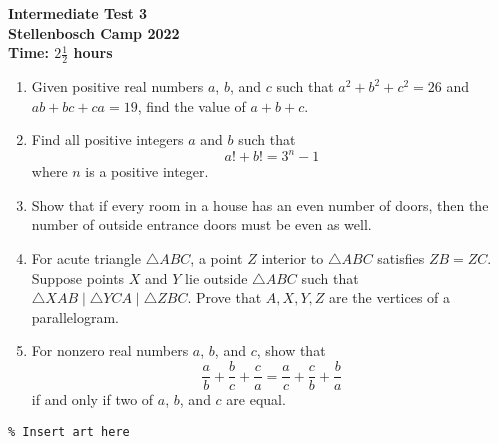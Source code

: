 \documentclass{article}
\begin{document}
\thispagestyle{empty}

\begin{center}
  \textbf{\Large Intermediate Test 3}
  \\ \vspace{1em}
  \textbf{\large Stellenbosch Camp 2022}
  \\ \vspace{1em}
  \textbf{\large Time: $2\frac{1}{2}$ hours}
\end{center}

\bigskip

\begin{enumerate}[itemsep=\fill]

\item %
Given positive real numbers $a$, $b$, and $c$ such that $a^2+b^2+c^2 = 26$ and $ab+bc+ca = 19$, find the value of $a+b+c$.


\item %
Find all positive integers $a$ and $b$ such that 
$$a! + b! = 3^n -1 $$
where $n$ is a positive integer.


\item %
Show that if every room in a house has an even number of doors, then the number of outside entrance doors must be even as well.


\item %
For acute triangle $\triangle ABC$, a point $Z$ interior to $\triangle ABC$ satisfies $ZB = ZC$.
Suppose points $X$ and $Y$ lie outside $\triangle ABC$ such that $\triangle XAB \mathop{|||} \triangle YCA \mathop{|||} \triangle ZBC$.
Prove that $A,X,Y,Z$ are the vertices of a parallelogram. 


\item %
For nonzero real numbers $a$, $b$, and $c$, show that
\[ \frac{a}{b} +\frac{b}{c} +\frac{c}{a} = \frac{a}{c} +\frac{c}{b} +\frac{b}{a} \]
if and only if two of $a$, $b$, and $c$ are equal.

\end{enumerate}


\vfill
\centering
\small
\begin{BVerbatim}
\end{BVerbatim}
\end{document}
